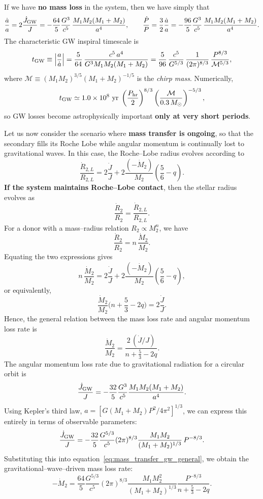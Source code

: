 If we have \textbf{no mass loss} in the system, then we have simply that
\[
\frac{\dot{a}}{a} = 2\frac{\dot{J}_{\rm GW}}{J}
= -\frac{64}{5}\frac{G^3}{c^5}\,\frac{M_1M_2(M_1+M_2)}{a^4},
\qquad
\frac{\dot{P}}{P}=\frac{3}{2}\frac{\dot{a}}{a}
= -\frac{96}{5}\frac{G^3}{c^5}\,\frac{M_1M_2(M_1+M_2)}{a^4}.
\]
The characteristic GW inspiral timescale is
\[
t_{\rm GW}\equiv\left|\frac{a}{\dot{a}}\right|
= \frac{5}{64}\,\frac{c^5\,a^4}{G^3 M_1M_2(M_1+M_2)}
= \frac{5}{96}\,\frac{c^5}{G^{5/3}}\,
\frac{1}{(2\pi)^{8/3}}\,
\frac{P^{8/3}}{\mathcal{M}^{5/3}},
\]
where $\mathcal{M}\equiv (M_1M_2)^{3/5}(M_1+M_2)^{-1/5}$ is the \emph{chirp mass}. Numerically,
\[
t_{\rm GW} \simeq 1.0\times10^{8}\ {\rm yr}\;
\left(\frac{P_{\rm hr}}{2}\right)^{8/3}
\left(\frac{\mathcal{M}}{0.3\,M_\odot}\right)^{-5/3},
\]
so GW losses become astrophysically important \textbf{only at very short periods}.
\medskip
\par
Let us now consider the scenario where \textbf{mass transfer is ongoing}, so that the secondary 
fills its Roche Lobe while angular momentum is continually lost to gravitational waves.
In this case, the Roche--Lobe radius evolves according to
\[
    \frac{\dot{R}_{2,L}}{R_{2,L}} = 2\frac{\dot{J}}{J}
    + 2\frac{(-\dot{M}_2)}{M_2}\left(\frac{5}{6}-q\right).
\]
\textbf{If the system maintains Roche--Lobe contact}, then the stellar radius evolves as
\[
\frac{\dot{R}_2}{R_2} = \frac{\dot{R}_{2,L}}{R_{2,L}}.
\]
For a donor with a mass--radius relation $R_2 \propto M_2^n$, we have
\[
\frac{\dot{R}_2}{R_2} = n\,\frac{\dot{M}_2}{M_2}.
\]
Equating the two expressions gives
\[
n\,\frac{\dot{M}_2}{M_2}
= 2\frac{\dot{J}}{J}
+ 2\frac{(-\dot{M}_2)}{M_2}\left(\frac{5}{6}-q\right),
\]
or equivalently,
\[
\frac{\dot{M}_2}{M_2}\bigg(n + \frac{5}{3} - 2q\bigg)
= 2\frac{\dot{J}}{J}.
\]
Hence, the general relation between the mass loss rate and angular momentum loss rate is
\begin{equation}
\label{eq:mass_transfer_gw_general}
\boxed{
\frac{\dot{M}_2}{M_2}
= \frac{2\,(\dot{J}/J)}{n + \tfrac{5}{3} - 2q}.
}
\end{equation}
The angular momentum loss rate due to gravitational radiation for a circular orbit is
\[
\frac{\dot{J}_{\rm GW}}{J}
= -\frac{32}{5}\frac{G^{3}}{c^5}
  \frac{M_1M_2(M_1 + M_2)}{a^{4}}.
\]
Using Kepler’s third law, $a = [G(M_1 + M_2)P^2 / 4\pi^2]^{1/3}$, we can express this entirely in terms of observable parameters:
\[
\frac{\dot{J}_{\rm GW}}{J}
= -\frac{32}{5}\frac{G^{5/3}}{c^{5}}(2\pi)^{8/3}
  \frac{M_1M_2}{(M_1+M_2)^{1/3}}\,P^{-8/3}.
\]
Substituting this into equation~\eqref{eq:mass_transfer_gw_general}, we obtain the gravitational--wave--driven mass loss rate:
\begin{equation}
\label{eq:mdot_gw_general}
\boxed{
-\dot{M}_2
= \frac{64}{5}\frac{G^{5/3}}{c^{5}}(2\pi)^{8/3}
  \frac{M_1M_2^2}{(M_1+M_2)^{1/3}}
  \frac{P^{-8/3}}{n + \tfrac{5}{3} - 2q}.
}
\end{equation}

